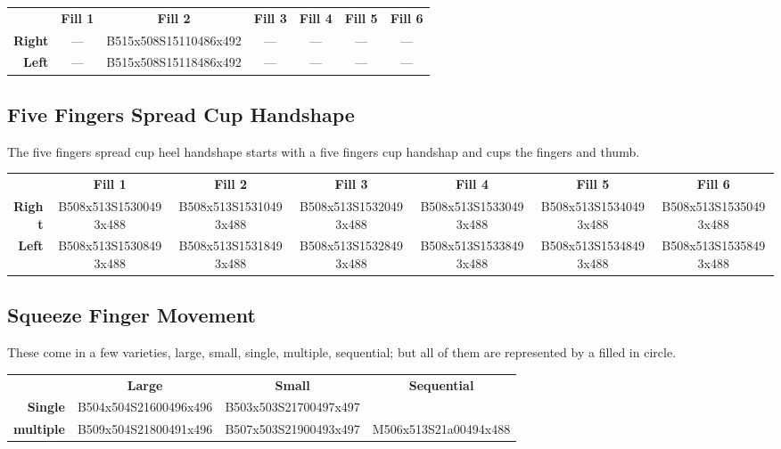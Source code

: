 \documentclass{article}
\begin{document}
\begin{center}
\begin{tabular}{r*{6}{c}}
&\textbf{Fill 1}&\textbf{Fill 2}&\textbf{Fill 3}&\textbf{Fill 4}&\textbf{Fill 5}&\textbf{Fill 6}\\
\textbf{Right}&
---&
B515x508S15110486x492&
---&
---&
---&
---\\
\textbf{Left}&
---&
B515x508S15118486x492&
---&
---&
---&
---\\
\end{tabular}
\end{center}

\subsection{Five Fingers Spread Cup Handshape}

The five fingers spread cup heel handshape starts with a five fingers cup handshap and cups the fingers and thumb.

\begin{center}
\begin{tabular}{r*{6}{c}}
&\textbf{Fill 1}&\textbf{Fill 2}&\textbf{Fill 3}&\textbf{Fill 4}&\textbf{Fill 5}&\textbf{Fill 6}\\
\textbf{Right}&
B508x513S15300493x488&
B508x513S15310493x488&
B508x513S15320493x488&
B508x513S15330493x488&
B508x513S15340493x488&
B508x513S15350493x488\\
\textbf{Left}&
B508x513S15308493x488&
B508x513S15318493x488&
B508x513S15328493x488&
B508x513S15338493x488&
B508x513S15348493x488&
B508x513S15358493x488\\
\end{tabular}
\end{center}

\subsection{Squeeze Finger Movement}

These come in a few varieties, large, small, single, multiple, sequential; but all of them are represented by a filled in circle.

\begin{center}
\begin{tabular}{r*{3}{c}}
&\textbf{Large}&\textbf{Small}&\textbf{Sequential}\\
\textbf{Single}  &B504x504S21600496x496&B503x503S21700497x497\\
\textbf{multiple}&B509x504S21800491x496&B507x503S21900493x497&M506x513S21a00494x488\\
\end{tabular}
\end{center}
\end{document}
